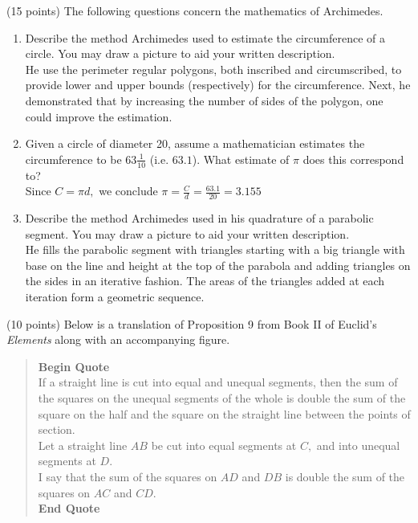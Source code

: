 \documentclass[11pt]{article}
\begin{document}
\item (15 points) The following questions concern the mathematics of Archimedes.
	\begin{enumerate}
	\item Describe the method Archimedes used to estimate the circumference of a circle. You may draw a picture to aid your written description.\\
	
	He use the perimeter regular polygons, both inscribed and circumscribed, to provide lower and upper bounds (respectively) for the circumference. Next, he demonstrated that by increasing the number of sides of the polygon, one could improve the estimation.
	
		
		\item Given a circle of diameter 20, assume a mathematician estimates the circumference to be $63\frac{1}{10}$ (i.e. $63.1$). What estimate of $\pi$ does this correspond to?\\
	Since $C=\pi d,$ we conclude $\pi = \frac{C}{d}=\frac{63.1}{20}=3.155$\\
	
	\item Describe the method Archimedes used in his quadrature of a parabolic segment. You may draw a picture to aid your written description.\\
	He fills the parabolic segment with triangles starting with a big triangle with base on the line and height at the top of the parabola and adding triangles on the sides in an iterative fashion. The areas of the triangles added at each iteration form a geometric sequence. 
	
		\end{enumerate}

\item (10 points) Below is a translation of Proposition 9 from Book II of Euclid's \emph{Elements} along with an accompanying figure.
\begin{quote} \textbf{Begin Quote} \\If a straight line is cut into equal and unequal segments, then the sum of the squares on the unequal segments of the whole is double the sum of the square on the half and the square on the straight line between the points of section. \\

Let a straight line $AB$ be cut into equal segments at $C,$ and into unequal segments at $D.$\\

I say that the sum of the squares on $AD$ and $DB$ is double the sum of the squares on $AC$ and $CD.$\\

\textbf{End Quote}
\end{quote}
\end{document}
